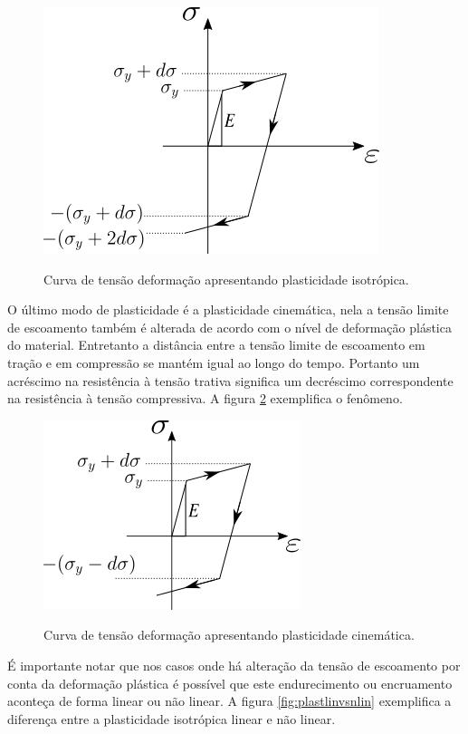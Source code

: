 \begin{figure}[H]
    \centering
    \caption{Curva de tensão deformação apresentando plasticidade isotrópica. }
    \includegraphics[width=0.5\linewidth]{images/plasticidade_iso.png}
    \label{fig:plastiso}
\end{figure}

O último modo de plasticidade é a plasticidade cinemática, nela a tensão limite de escoamento também é alterada de acordo com o nível de deformação plástica do material. Entretanto a distância entre a tensão limite de escoamento em tração e em compressão se mantém igual ao longo do tempo. Portanto um acréscimo na resistência à tensão trativa significa um decréscimo correspondente na resistência à tensão compressiva. A figura \ref{fig:plastcin} exemplifica o fenômeno. \par

\begin{figure}[H]
    \centering
    \caption{Curva de tensão deformação apresentando plasticidade cinemática. }
    \includegraphics[width=0.5\linewidth]{images/plasticidade_cinem.png}
    \label{fig:plastcin}
\end{figure}

É importante notar que nos casos onde há alteração da tensão de escoamento por conta da deformação plástica é possível que este endurecimento ou encruamento aconteça de forma linear ou não linear. A figura \ref{fig:plastlinvsnlin} exemplifica a diferença entre a plasticidade isotrópica linear e não linear. \par

